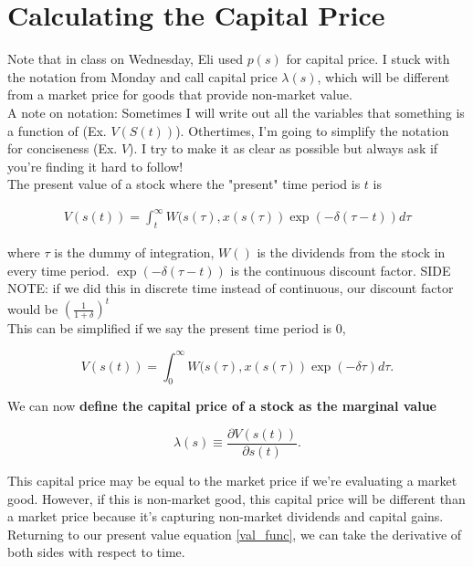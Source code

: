 \documentclass{article}
\begin{document}
\section{Calculating the Capital Price}

Note that in class on Wednesday, Eli used $p(s)$ for capital price. I stuck with the notation from Monday and call capital price $\lambda(s)$, which will be different from a market price for goods that provide non-market value. \\

A note on notation: Sometimes I will write out all the variables that something is a function of (Ex. $V(S(t))$). Othertimes, I'm going to simplify the notation for conciseness (Ex. $V$). I try to make it as clear as possible but always ask if you're finding it hard to follow! \\


The present value of a stock where the "present" time period is $t$ is

\begin{align}
    V(s(t)) = \int_t^\infty W(s(\tau), x(s(\tau)) \exp(-\delta(\tau-t))d\tau
    \label{val_func}
\end{align}

where $\tau$ is the dummy of integration, $W()$ is the dividends from the stock in every time period. $\exp(-\delta(\tau-t))$ is the continuous discount factor. SIDE NOTE: if we did this in discrete time instead of continuous, our discount factor would be  $(\frac{1}{1+\delta})^t$\\

This can be simplified if we say the present time period is 0, 

$$ V(s(t)) = \int_0^\infty W(s(\tau), x(s(\tau)) \exp(-\delta\tau)d\tau. $$

We can now \textbf{define the capital price of a stock as the marginal value }

$$\lambda(s) \equiv \frac{\partial V(s(t))}{\partial s(t)}.$$

This capital price may be equal to the market price if we're evaluating a market good. However, if this is non-market good, this capital price will be different than a market price because it's capturing non-market dividends and capital gains.\\

Returning to our present value equation \ref{val_func}, we can take the derivative of both sides with respect to time. \\
\end{document}
